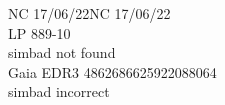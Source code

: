 NC 17/06/22NC 17/06/22\\

LP 889-10\\
simbad not found \\

Gaia EDR3 4862686625922088064\\
simbad incorrect\\
